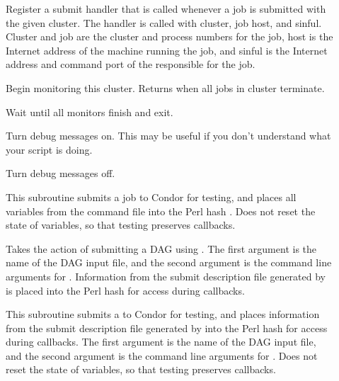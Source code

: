 \begin{description}
	\item []
	Register a submit handler that is called whenever a job is submitted
	with the given cluster.  The handler is called with cluster, job 
	host, and sinful. Cluster and job are the cluster and
	process numbers for the job, host is the Internet address of the
	machine running the job, and sinful is the Internet address and
	command port of the  responsible for the job.

	\item []
	Begin monitoring this cluster. Returns when all jobs in cluster
	terminate.  \\
	
	\item []
	Wait until all monitors finish and exit.

	\item []
	Turn debug messages on.  This may be useful if you don't understand
	what your script is doing.	

	\item []
	Turn debug messages off.

  \item []
  This subroutine submits a job to Condor for testing, and places
  all variables from the command file into
  the Perl hash .
  Does not reset the state of variables, so that testing preserves
  callbacks.

  \item []
  Takes the action of submitting a DAG using .
  The first argument is the name of the DAG input file, 
  and the second argument is the command line arguments for 
  .
  Information from the submit description file generated by
   is placed into the Perl hash 
  for access during callbacks.

  \item []
  This subroutine submits a  to Condor for testing,
  and places information from the submit description file generated by
   into the Perl hash 
  for access during callbacks.
  The first argument is the name of the DAG input file, 
  and the second argument is the command line arguments for 
  .
  Does not reset the state of variables, so that testing preserves
  callbacks.


\end{description}
